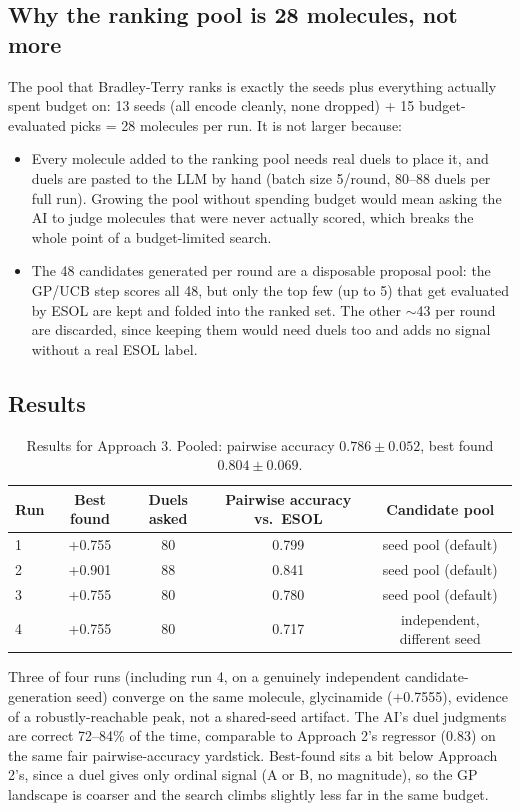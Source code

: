 \documentclass[11pt,a4paper]{article}
\begin{document}
\subsection{Why the ranking pool is 28 molecules, not more}
The pool that Bradley-Terry ranks is exactly the seeds plus everything actually spent budget on: 13 seeds (all encode cleanly, none dropped) + 15 budget-evaluated picks = 28 molecules per run. It is not larger because:
\begin{itemize}
    \item Every molecule added to the ranking pool needs real duels to place it, and duels are pasted to the LLM by hand (batch size 5/round, 80--88 duels per full run). Growing the pool without spending budget would mean asking the AI to judge molecules that were never actually scored, which breaks the whole point of a budget-limited search.
    \item The 48 candidates generated per round are a disposable proposal pool: the GP/UCB step scores all 48, but only the top few (up to 5) that get evaluated by ESOL are kept and folded into the ranked set. The other $\sim$43 per round are discarded, since keeping them would need duels too and adds no signal without a real ESOL label.
\end{itemize}

\subsection{Results}
\begin{table}[h]
\centering
\begin{tabular}{lcccc}
\hline
Run & Best found & Duels asked & Pairwise accuracy vs.\ ESOL & Candidate pool \\
\hline
1 & +0.755 & 80 & 0.799 & seed pool (default) \\
2 & +0.901 & 88 & 0.841 & seed pool (default) \\
3 & +0.755 & 80 & 0.780 & seed pool (default) \\
4 & +0.755 & 80 & 0.717 & independent, different seed \\
\hline
\end{tabular}
\caption{Results for Approach 3. Pooled: pairwise accuracy $0.786 \pm 0.052$, best found $0.804 \pm 0.069$.}
\label{tab:results_a3}
\end{table}

Three of four runs (including run 4, on a genuinely independent candidate-generation seed) converge on the same molecule, glycinamide (+0.7555), evidence of a robustly-reachable peak, not a shared-seed artifact. The AI's duel judgments are correct 72--84\% of the time, comparable to Approach 2's regressor (0.83) on the same fair pairwise-accuracy yardstick. Best-found sits a bit below Approach 2's, since a duel gives only ordinal signal (A or B, no magnitude), so the GP landscape is coarser and the search climbs slightly less far in the same budget.
\end{document}
